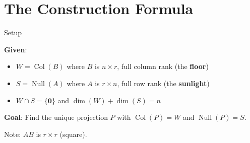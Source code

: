 \documentclass[10pt]{beamer}
\theoremstyle{definition}
\newcommand{\x}[1]{\alert{\textbf{#1}}}
\begin{document}
\section{The Construction Formula}


\begin{frame}{Setup}

\x{Given}:
\begin{itemize}
\item $W = \operatorname{Col}(B)$ where $B$ is $n \times r$, full column rank \quad (the \x{floor})
\item $S = \operatorname{Null}(A)$ where $A$ is $r \times n$, full row rank \quad (the \x{sunlight})
\item $W \cap S = \{\mathbf{0}\}$ and $\dim(W) + \dim(S) = n$
\end{itemize}

\vspace{0.5em}

\x{Goal}: Find the unique projection $P$ with $\operatorname{Col}(P) = W$ and $\operatorname{Null}(P) = S$.

\vspace{0.5em}

Note: $AB$ is $r \times r$ (square).

\end{frame}
\end{document}
